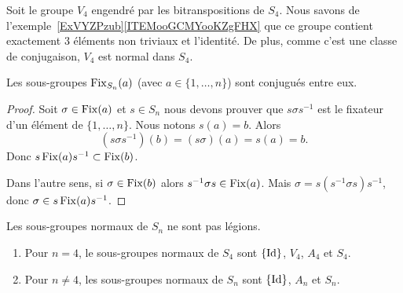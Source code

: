 \begin{normaltext}     \label{NORMooQAZTooBQLqDn}
    Soit le groupe \( V_4\) engendré par les bitranspositions de \( S_4\). Nous savons de l'exemple~\ref{ExVYZPzub}\ref{ITEMooGCMYooKZgFHX} que ce groupe contient exactement \( 3\) éléments non triviaux et l'identité. De plus, comme c'est une classe de conjugaison, \( V_4\) est normal dans \( S_4\).
\end{normaltext}

\begin{lemma}
    Les sous-groupes \( \operatorname{Fix}_{S_n}(a)\) (avec \( a\in\{ 1,\ldots, n \}\)) sont conjugués entre eux.
\end{lemma}

\begin{proof}
    Soit \( \sigma\in \operatorname{Fix}(a)\) et \( s\in S_n\) nous devons prouver que \( s \sigma s^{-1}\) est le fixateur d'un élément de \( \{ 1,\ldots, n \}\). Nous notons \( s(a)=b\). Alors
    \begin{equation}
        (s\sigma s^{-1})(b)=(s\sigma)(a)=s(a)=b.
    \end{equation}
    Donc \( s\operatorname{Fix}(a)s^{-1}\subset \operatorname{Fix}(b)\).

    Dans l'autre sens, si \( \sigma\in \operatorname{Fix}(b)\) alors \( s^{-1} \sigma s\in\operatorname{Fix}(a)\). Mais \( \sigma=s(s^{-1}\sigma s)s^{-1}\), donc \( \sigma\in s\operatorname{Fix}(a)s^{-1}\).
\end{proof}

\begin{proposition}     \label{PROPooOTJAooUbzGZm}
    Les sous-groupes normaux de \( S_n\) ne sont pas légions.
    \begin{enumerate}
        \item
            Pour \( n=4\), le sous-groupes normaux de \( S_4\) sont \(  \{ \operatorname{Id} \}  \), \( V_4\), \( A_4\) et \( S_4\).
        \item
            Pour \( n\neq 4\), les sous-groupes normaux de \( S_n\) sont \( \{ \operatorname{Id} \}\), \( A_n\) et \( S_n\).
    \end{enumerate}
\end{proposition}

